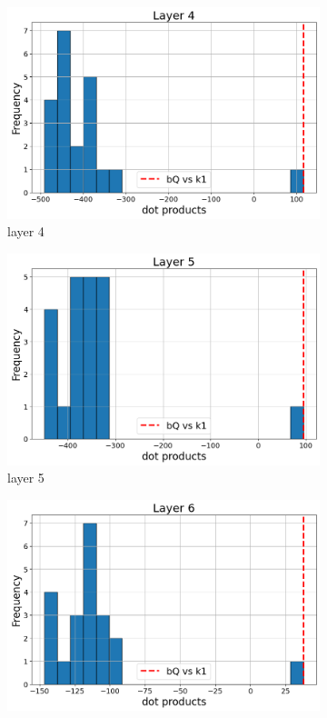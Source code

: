 \documentclass[11pt]{article}
\begin{document}
\begin{figure}[t]
  \begin{subfigure}[t]{0.24\textwidth}
    \centering
    \includegraphics[width=1.4\columnwidth]{figures/obs1_appendix/obs1_layer4.png}
    \caption{layer 4}
  \end{subfigure}\hfill
  \begin{subfigure}[t]{0.24\textwidth}
    \centering
    \includegraphics[width=1.4\columnwidth]{figures/obs1_appendix/obs1_layer5.png}
    \caption{layer 5}
  \end{subfigure}\hfill
  \begin{subfigure}[t]{0.24\textwidth}
    \centering
    \includegraphics[width=1.4\columnwidth]{figures/obs1_appendix/obs1_layer6.png}

\end{subfigure}
\end{figure}
\end{document}
